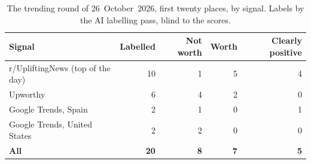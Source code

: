 \begin{table}[ht]
\centering
\small
\caption{The trending round of 26~October~2026, first twenty places, by
signal. Labels by the AI labelling pass, blind to the scores.}
\label{tab:trends-day1}
\begin{tabular}{@{}lrrrr@{}}
\toprule
\textbf{Signal} & \textbf{Labelled} & \textbf{Not worth} & \textbf{Worth} & \textbf{Clearly positive} \\
\midrule
r/UpliftingNews (top of the day) & 10 & 1 & 5 & 4 \\
Upworthy & 6 & 4 & 2 & 0 \\
Google Trends, Spain & 2 & 1 & 0 & 1 \\
Google Trends, United States & 2 & 2 & 0 & 0 \\
\midrule
\textbf{All} & \textbf{20} & \textbf{8} & \textbf{7} & \textbf{5} \\
\bottomrule
\end{tabular}
\end{table}

